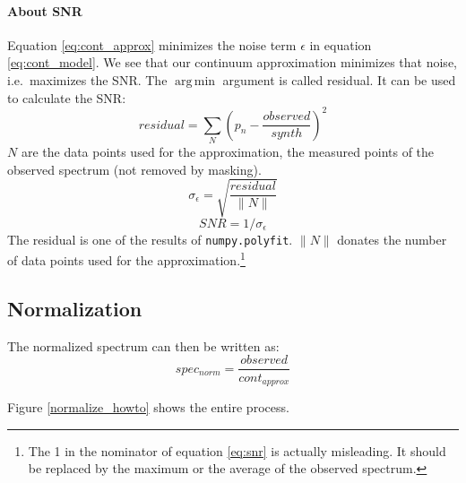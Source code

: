 \documentclass[10pt,a4paper,notitlepage,twocolumn]{article}
\DeclareMathOperator*{\argmin}{arg\,min}
\begin{document}
\paragraph{About SNR}
Equation \ref{eq:cont_approx} minimizes the noise term $\epsilon$ in equation \ref{eq:cont_model}.
We see that our continuum approximation minimizes that noise, i.e.\ maximizes the SNR.
The $\argmin$ argument is called residual. It can be used to calculate the SNR:
\begin{equation}
	residual = \sum_N \left( p_n - \frac{observed}{synth} \right)^2
\end{equation}
$N$ are the data points used for the approximation, the measured points of the observed spectrum (not removed by masking).
\begin{equation}
	\sigma_\epsilon = \sqrt{ \frac{residual}{\|N\|}}
\end{equation}
\begin{equation}
	\label{eq:snr}
	SNR = 1 / \sigma_\epsilon
\end{equation}
The residual is one of the results of \verb|numpy.polyfit|.
$\|N\|$ donates the number of data points used for the approximation.\footnote{The 1 in the nominator of equation \ref{eq:snr} is actually misleading. It should be replaced by the maximum or the average of the observed spectrum.}

\subsection{Normalization}
The normalized spectrum can then be written as:
\begin{equation}
	spec_{norm} = \frac{observed}{cont_{approx}}
\end{equation}

Figure \ref*{normalize_howto} shows the entire process.
\end{document}
